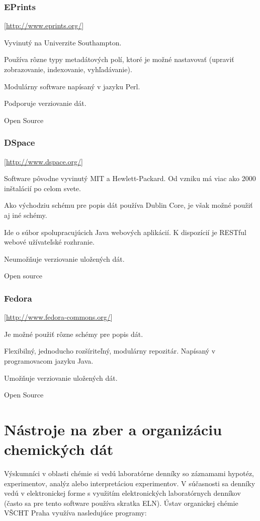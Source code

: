 \documentclass[thesis=M,slovak]{FITthesis}[2013/05/06]
\begin{document}
\subsubsection {EPrints} [\url{http://www.eprints.org/}]

Vyvinutý na Univerzite Southampton.

Používa rôzne typy metadátových polí, ktoré je možné nastavovať (upraviť zobrazovanie, indexovanie, vyhľadávanie).

Modulárny software napísaný v jazyku Perl.

Podporuje verziovanie dát.

Open Source

\subsubsection {DSpace} [\url{http://www.dspace.org/}]

Software pôvodne vyvinutý MIT a Hewlett-Packard. Od vzniku má viac ako 2000 inštalácií po celom svete. 

Ako východziu schému pre popis dát používa Dublin Core, je však možné použiť aj iné schémy.

Ide o súbor spolupracujúcich Java webových aplikácií. K dispozícií je RESTful webové užívateľské rozhranie.

Neumožňuje verziovanie uložených dát.

Open source

\subsubsection {Fedora} [\url{http://www.fedora-commons.org/}]

Je možné použiť rôzne schémy pre popis dát.

Flexibilný, jednoducho rozšíriteľný, modulárny repozitár. Napísaný v programovacom jazyku Java.

Umožňuje verziovanie uložených dát.

Open Source


\section{Nástroje na zber a organizáciu chemických dát}
Výskumníci v oblasti chémie si vedú laboratórne denníky so záznamami hypotéz, experimentov, analýz alebo interpretáciou experimentov. V súčasnosti sa denníky vedú v elektronickej forme s využitím elektronických laboratórnych denníkov (často sa pre tento software používa skratka ELN). Ústav organickej chémie VŠCHT Praha využíva nasledujúce programy:
\end{document}
